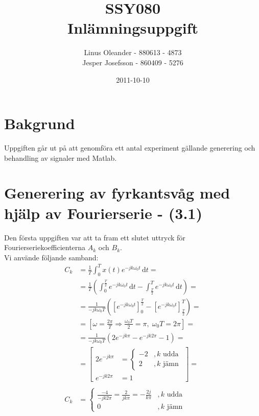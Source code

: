 \documentclass[]{article}
\title{SSY080 \\ Inlämningsuppgift}
\author{
Linus Oleander - 880613 - 4873 \\
Jesper Josefsson - 860409 - 5276 
}
\date{2011-10-10}
\begin{document}
\ifpdf
{}
\else
{}
\fi

\maketitle

\section{Bakgrund}
Uppgiften går ut på att genomföra ett antal experiment gällande generering och behandling av signaler med Matlab.

\section{Generering av fyrkantsvåg med hjälp av Fourierserie - (3.1)}
Den första uppgiften var att ta fram ett slutet uttryck för Fourierseriekoefficienterna $A_k$ och $B_k$.\\
Vi använde följande samband:\\
\begin{align*}
	C_k &= \frac{1}{T} \int_0^T \! x(t) e^{-jk\omega_0 t}\, \mathrm{d} t =\\
	    &= \frac{1}{T} \left(
	          \int_0^{\frac{T}{2}} \! e^{-jk\omega_0 t}\, \mathrm{d} t
	          - \int_{\frac{T}{2}}^T \! e^{-jk\omega_0 t}\, \mathrm{d} t \right) =\\
      &= \frac{1}{-jk\omega_0 T} \left(
            \left[e^{-jk\omega_0 t}\right]_0^{\frac{T}{2}}
            - \left[e^{-jk\omega_0 t}\right]_{\frac{T}{2}}^T
          \right) = \\
      &= \left[
          \omega = \frac{2\pi}{T} \Rightarrow \frac{\omega_0 T}{2} = \pi ,\;  \omega_0 T = 2\pi
        \right] = \\
      &= \frac{1}{-jk\omega_0 T} \left(
          2e^{-jk\pi} - e^{-jk2\pi} - 1
        \right) = \\
      &=  \left[
          \begin{array}{ll}
            2e^{-jk\pi} &=
              \left\{
              	\begin{array}{ll}
              		-2  & ,k\text{ udda} \\
              		2 & ,k\text{ jämn} 
              	\end{array}
              \right. \\
            e^{-jk2\pi} &= 1
          \end{array}
          \right] = \\ \\
  C_k &= \left\{ \begin{array}{ll}
            \frac{-4}{-jk2\pi} = \frac{2}{jk\pi} = -\frac{2j}{k\pi}&,k\text{ udda} \\
            0 &,k\text{ jämn}
          \end{array} \right.\\
\end{align*}




\end{document}
